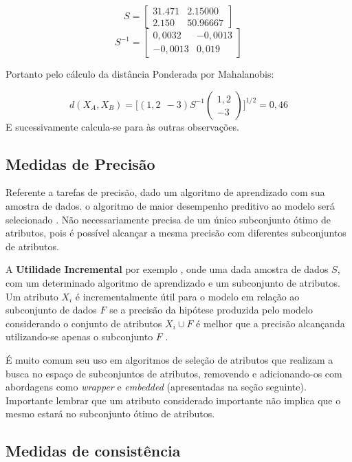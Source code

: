 \documentclass[
]{book}
\begin{document}
\[S=
\begin{bmatrix}
31.471& 2.15000 \\
2.150& 50.96667 
\end{bmatrix}\]
\[S^{-1}=
\begin{bmatrix}
0,0032& -0,0013 \\
-0,0013& 0,019 
\end{bmatrix}\]

Portanto pelo cálculo da distância Ponderada por Mahalanobis:

\[d(X_A,X_B)=\bigg[(1,2 \ \ -3) S^{-1} \begin{pmatrix} 1,2 \\ -3  \end{pmatrix} \bigg]^{1/2}=0,46\]
E sucessivamente calcula-se para às outras observações.

\hypertarget{medidas-de-precisuxe3o}{%
\subsection{Medidas de Precisão}\label{medidas-de-precisuxe3o}}

Referente a tarefas de precisão, dado um algoritmo de aprendizado com sua amostra de dados. o algoritmo de maior desempenho preditivo ao modelo será selecionado \citep{kohavi1997wrappers}. Não necessariamente precisa de um único subconjunto ótimo de atributos, pois é possível alcançar a mesma precisão com diferentes subconjuntos de atributos.

A \textbf{Utilidade Incremental} por exemplo \citep{caruana1994useful}, onde uma dada amostra de dados \(S\), com um determinado algoritmo de aprendizado e um subconjunto de atributos. Um atributo \(X_i\) é incrementalmente útil para o modelo em relação ao subconjunto de dados \(F\) se a precisão da hipótese produzida pelo modelo considerando o conjunto de atributos \(X_i \cup F\) é melhor que a precisão alcançanda utilizando-se apenas o subconjunto \(F\) \citep{lee2005seleccao}.

É muito comum seu uso em algoritmos de seleção de atributos que realizam a busca no espaço de subconjuntos de atributos, removendo e adicionando-os com abordagens como \emph{wrapper} e \emph{embedded} (apresentadas na seção seguinte). Importante lembrar que um atributo considerado importante não implica que o mesmo estará no subconjunto ótimo de atributos.

\hypertarget{medidas-de-consistuxeancia}{%
\subsection{Medidas de consistência}\label{medidas-de-consistuxeancia}}
\end{document}
